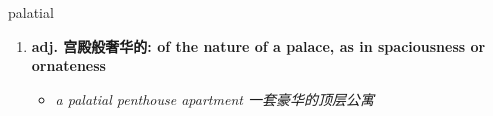 
\begin{frame}
{\huge palatial}
\begin{center}
\begin{enumerate}\Large
  \item \textbf{adj. 宫殿般奢华的: of the nature of a palace, as in spaciousness or ornateness}
  \begin{itemize}
    \item \em{\Large{a palatial penthouse apartment 一套豪华的顶层公寓}}
  \end{itemize}
\end{enumerate}
\end{center}
\end{frame}
